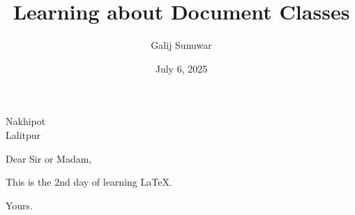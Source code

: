 \documentclass{letter}
\title{Learning about Document Classes}
\author{Galij Sunuwar}
\date{July 6, 2025}
\begin{document}
\maketitle

\begin{letter}{Nakhipot\\Lalitpur}

\opening{Dear Sir or Madam,}

This is the 2nd day of learning LaTeX.

\closing{Yours.}

\end {letter}
\end{document}
